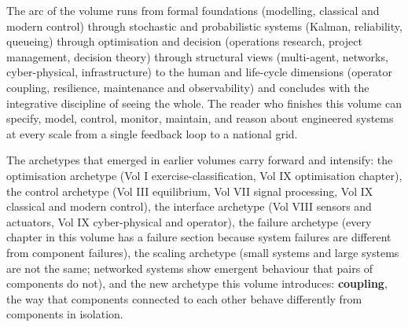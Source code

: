 The arc of the volume runs from formal foundations (modelling, classical and modern control) through stochastic and probabilistic systems (Kalman, reliability, queueing) through optimisation and decision (operations research, project management, decision theory) through structural views (multi-agent, networks, cyber-physical, infrastructure) to the human and life-cycle dimensions (operator coupling, resilience, maintenance and observability) and concludes with the integrative discipline of seeing the whole. The reader who finishes this volume can specify, model, control, monitor, maintain, and reason about engineered systems at every scale from a single feedback loop to a national grid.

The archetypes that emerged in earlier volumes carry forward and intensify: the optimisation archetype (Vol I exercise-classification, Vol IX optimisation chapter), the control archetype (Vol III equilibrium, Vol VII signal processing, Vol IX classical and modern control), the interface archetype (Vol VIII sensors and actuators, Vol IX cyber-physical and operator), the failure archetype (every chapter in this volume has a failure section because system failures are different from component failures), the scaling archetype (small systems and large systems are not the same; networked systems show emergent behaviour that pairs of components do not), and the new archetype this volume introduces: \textbf{coupling}, the way that components connected to each other behave differently from components in isolation.


\vspace{1cm}
